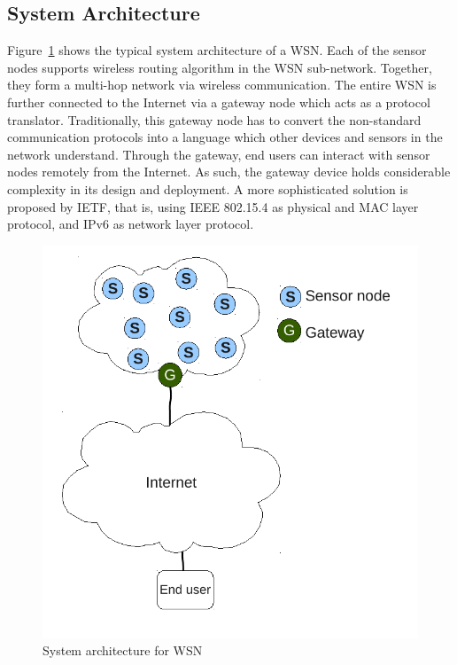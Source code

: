 \subsection{System Architecture}
\label{General:WSN:SysArc}

Figure~\ref{fig:WSNArc} shows the typical system architecture of a WSN. Each of the sensor nodes supports wireless routing algorithm in the WSN sub-network. Together, they form a multi-hop network via wireless communication. The entire WSN is further connected to the Internet via a gateway node which acts as a protocol translator. Traditionally, this gateway node has to convert the non-standard communication protocols into a language which other devices and sensors in the network understand. Through the gateway, end users can interact with sensor nodes remotely from the Internet. As such, the gateway device holds considerable complexity in its design and deployment. A more sophisticated solution is proposed by IETF, that is, using IEEE 802.15.4 as physical and MAC layer protocol, and IPv6 as network layer protocol. 
\begin{figure}[htbp]
  \begin{center}
    \leavevmode
      \includegraphics[scale=0.5]
      {Pics/WSNArc.pdf}
   \caption{System architecture for WSN}
    \label{fig:WSNArc}
  \end{center}
\end{figure}

